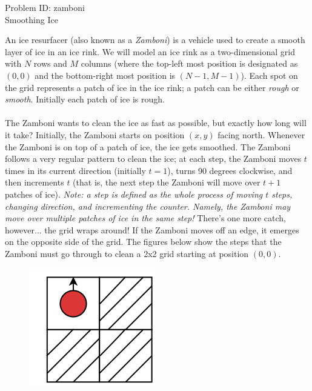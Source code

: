 \documentclass[a4paper,11pt]{article}
\begin{document}
\begin{center}
{\Huge Problem ID: zamboni}\vspace{2 mm} \\	%
{\huge Smoothing Ice}\vspace{2 mm} \\	%
\end{center}
\setcounter{page}{15}
\large{
An ice resurfacer (also known as a \emph{Zamboni}) is a vehicle used to create a smooth layer of ice in an ice rink. We will model an ice rink as a two-dimensional grid with $N$ rows and $M$ columns (where the top-left most position is designated as $(0, 0)$ and the bottom-right most position is $(N-1, M-1)$). Each spot on the grid represents a patch of ice in the ice rink; a patch can be either \emph{rough} or \emph{smooth}. Initially each patch of ice is rough.\\\\
The Zamboni wants to clean the ice as fast as possible, but exactly how long will it take? Initially, the Zamboni starts on position $(x, y)$ facing north. Whenever the Zamboni is on top of a patch of ice, the ice gets smoothed. The Zamboni follows a very regular pattern to clean the ice; at each step, the Zamboni moves $t$ times in its current direction (initially $t=1$), turns 90 degrees clockwise, and then increments $t$ (that is, the next step the Zamboni will move over $t+1$ patches of ice). \emph{Note: a step is defined as the whole process of moving $t$ steps, changing direction, and incrementing the counter. Namely, the Zamboni may move over multiple patches of ice in the same step!} There's one more catch, however... the grid wraps around! If the Zamboni moves off an edge, it emerges on the opposite side of the grid. The figures below show the steps that the Zamboni must go through to clean a 2x2 grid starting at position $(0,0)$.
\begin{figure}[!htb]
  \includegraphics[width=\linewidth]{step1pt1.png}

\end{figure}}
\end{document}
